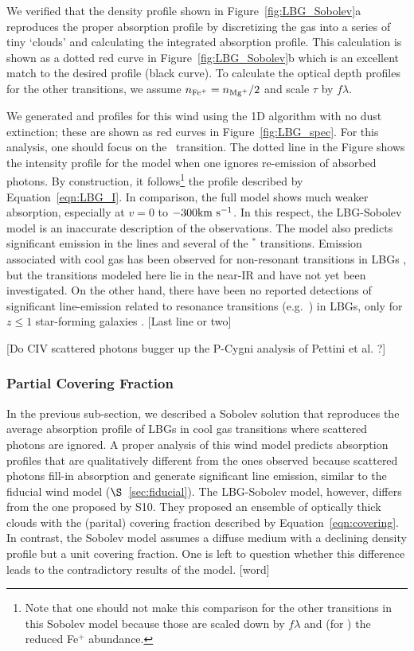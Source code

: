 \documentclass[12pt,preprint]{aastex}
\begin{document}
We verified that the density profile shown in
Figure~\ref{fig:LBG_Sobolev}a
reproduces the proper
absorption profile by discretizing the gas into a series of tiny
`clouds' and calculating the integrated absorption profile.  This
calculation is shown as a dotted red curve in
Figure~\ref{fig:LBG_Sobolev}b which is an excellent
match to the desired profile (black curve).
To calculate the optical depth profiles for the other transitions, we
assume $n_{\rm Fe^+} = n_{\rm Mg^+}/2$ and scale $\tau$ by $f\lambda$.

We generated  and  profiles for this wind
using the 1D algorithm with no dust extinction; these are shown as
red curves in Figure~\ref{fig:LBG_spec}.   For this analysis, one
should focus on the \mgiia\ transition.  The dotted line in the Figure
shows the intensity profile for the model when one ignores re-emission
of absorbed photons.  By construction, it follows\footnote{Note that
  one should not make this comparison for the other transitions in
  this Sobolev model because those are scaled down by $f\lambda$ and
  (for ) the reduced Fe$^+$ abundance.} the profile
described by Equation~\ref{eqn:LBG_I}.   In comparison, the full model
shows much weaker absorption, especially at $v = 0$ to $-300 {\rm km~s^{-1}}$.
In this respect, the LBG-Sobolev model is an
inaccurate description of the observations. The model
also predicts significant emission in the  lines and several of
the $^*$ transitions.   Emission associated with cool gas
has been observed for non-resonant 
transitions in LBGs \citep{cb58,shapley}, but
the  transitions
modeled here lie in the near-IR and have not yet been investigated.
On the other hand, there have been no 
reported detections of significant line-emission related to resonance
transitions (e.g.\ ) in LBGs, only for $z \le 1$ star-forming galaxies
\citep{wcp+09,rubin09}.  
[Last line or two]

[Do CIV scattered photons bugger up the P-Cygni analysis of Pettini
et al. ?]
 
\subsubsection{Partial Covering Fraction}
\label{sec:Covering}

In the previous sub-section, we described a Sobolev solution that
reproduces the average absorption profile of LBGs in cool gas
transitions where scattered photons are ignored.  A proper analysis of
this wind model predicts absorption profiles that are qualitatively
different from the ones observed because scattered photons fill-in
absorption and generate significant line emission, similar to the
fiducial wind model ($\S$~\ref{sec:fiducial}).
The LBG-Sobolev model, however, differs from
the one proposed by S10.  They proposed an ensemble of optically
thick clouds with the (parital) covering fraction described by
Equation~\ref{eqn:covering}.   In contrast, the Sobolev model assumes
a diffuse medium with a declining density profile but a unit covering
fraction.  One is left to question whether this difference leads to
the contradictory results of the model. [word]
\end{document}
